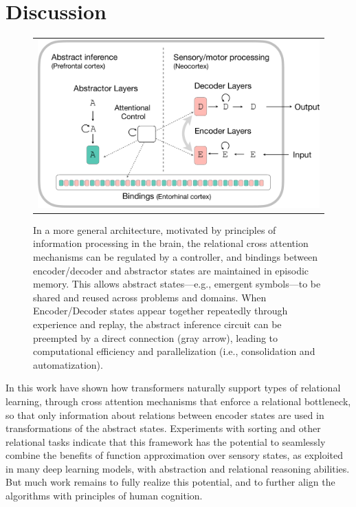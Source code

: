 \section{Discussion}
\label{sec:discuss}

\begin{figure}[t]
    \vspace{-3mm}
    \begin{center}
    \begin{tabular}{c}
        \hskip2pt\includegraphics[width=.60\textwidth]{figures/algorithm-diagram2-crop} 
    \end{tabular}
    \caption{In a more general architecture, motivated by principles of information processing 
    in the brain, the relational cross attention mechanisms can be regulated by a controller, and bindings between encoder/decoder and abstractor states are maintained in episodic memory. This allows abstract states---e.g., emergent symbols---to be shared and reused across problems and domains. When Encoder/Decoder states appear together repeatedly through experience and replay, the abstract inference circuit can be preempted by a direct connection (gray arrow), leading to computational efficiency and parallelization (i.e., consolidation and automatization).
    }
    \label{fig:algo2}
    \vskip-12pt
    \end{center}
\end{figure}

In this work have shown how transformers naturally support types of relational learning, through cross attention mechanisms that enforce a relational bottleneck, so that only information about relations between encoder states 
are used in transformations of the abstract states. Experiments with sorting and other relational tasks indicate that this framework has the potential to seamlessly combine the benefits of function approximation over sensory states, as exploited in many deep learning models, with abstraction and relational reasoning abilities. But much 
work remains to fully realize this potential, and to further align the algorithms with principles of human cognition.

